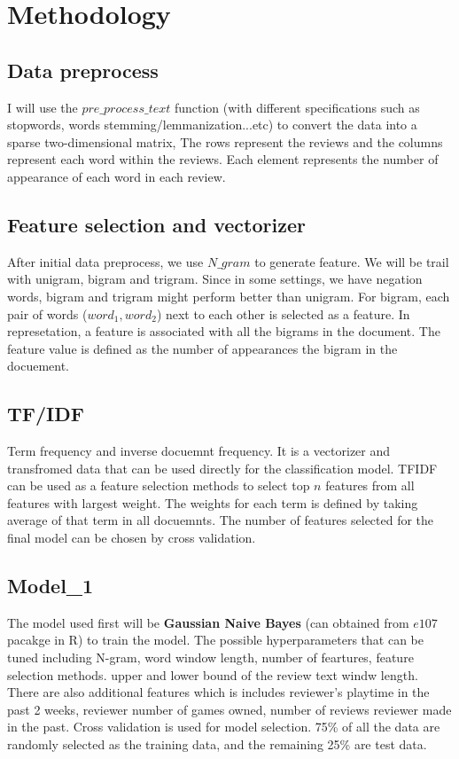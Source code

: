 \documentclass[11pt]{scrartcl}
\begin{document}
\section*{Methodology}



    \subsection*{Data preprocess}
     I will use the $pre\_process\_text$ function (with different specifications such as stopwords, words stemming/lemmanization...etc) to convert the data into a sparse two-dimensional matrix, The rows represent the reviews and the columns represent each word within the reviews. Each element represents the number of appearance of each word in each review.


    
    \subsection*{Feature selection and vectorizer}
     After initial data preprocess, we use $N\_gram$ to generate feature. We will be trail with unigram, bigram and trigram. Since in some settings, we have negation words, bigram and trigram might perform better than unigram. For bigram, each pair of words ($word_1, word_2$) next to each other is selected as a feature. In represetation, a feature is associated with all the bigrams in the document. The feature value is defined as the number of appearances the bigram in the docuement. 
        
    \subsection*{TF/IDF}
     Term frequency and inverse docuemnt frequency. It is a vectorizer and transfromed data that can be used directly for the classification model. TFIDF can be used as a feature selection methods to select top $n$ features from all features with largest weight. The weights for each term is defined by taking average of that term in all docuemnts. The number of features selected for the final model can be chosen by cross validation. 
    

    \subsection*{Model\_1}
     The model used first will be \textbf{Gaussian Naive Bayes} (can obtained from $e107$ pacakge in R)  to train the model. The possible hyperparameters that can be tuned including N-gram, word window length, number of feartures, feature selection methods. upper and lower bound of the review text windw length. There are also additional features which is includes reviewer's playtime in the past 2 weeks, reviewer number of games owned, number of reviews reviewer made in the past. Cross validation is used for model selection. 75\% of all the data are randomly selected as the training data, and the remaining 25\% are test data.  
\end{document}
